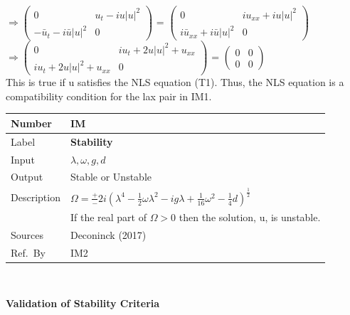 \documentclass[12pt]{article}
\newcommand{\colAwidth}{0.13\textwidth}
\newcommand{\colBwidth}{0.82\textwidth}
\newcounter{instnum} %
\begin{document}
$ \Rightarrow \begin{pmatrix} 
0 & u_{t} - iu|u|^{2} \\
-\bar{u}_{t} - i\bar{u}|u|^{2} & 0
\end{pmatrix} $ = 
$ \begin{pmatrix} 
0 & iu_{xx} + iu|u|^{2} \\
i\bar{u}_{xx} + i \bar{u}|u|^{2} & 0
\end{pmatrix} $ \\ 
$ \Rightarrow \begin{pmatrix} 
0 & iu_{t} + 2u|u|^{2} + u_{xx} \\
iu_{t} + 2u|u|^{2} + u_{xx} & 0
\end{pmatrix} $ = 
$ \begin{pmatrix} 
0 & 0 \\
0 & 0
\end{pmatrix} $ \\ 


This is true if u satisfies the NLS equation (T1). Thus, the NLS equation is a 
compatibility 
condition for the lax pair in IM1. \\

\noindent
\begin{minipage}{\textwidth}
	\renewcommand*{\arraystretch}{1.5}
	\begin{tabular}{| p{\colAwidth} | p{\colBwidth}|}
		\hline
		\rowcolor[gray]{0.9}
		Number& IM{instnum}\theinstnum \label{ewat}\\
		\hline
		Label& \bf Stability\\
		\hline
		Input &$\lambda, \omega, g, d$\\
		\hline
		Output& Stable or Unstable \\ 
		\hline
		Description& $\Omega = \frac{+}{-} 2i (\lambda^{4} - \frac{1}{2}\omega 
		\lambda^{2} - ig\lambda + \frac{1}{16}\omega^{2} - 
		\frac{1}{4}d)^{\frac{1}{2}}$ \\
		& If the real part of $\Omega > 0$  then the solution, u, 
		is unstable. \\
		\hline
		Sources& Deconinck (2017) \\
		\hline
		Ref.\ By & IM2\\
		\hline
	\end{tabular}
\end{minipage} \\

\begin{center}
	\begin{flushleft}
		\textbf{Validation of Stability Criteria}
	\end{flushleft} 
	
\end{center} 
\end{document}
